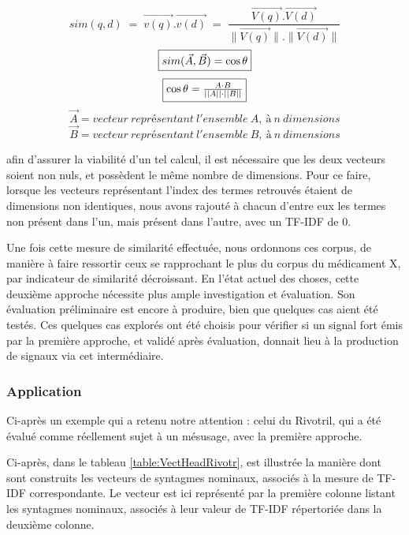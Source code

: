 \documentclass[a4paper, 12pt, openany, oneside, abstract=on]{article} %
\begin{document}
\begin{minipage}{\textwidth}
$$ sim(q,d) \; = \; \vec{v(q)} . \vec{v(d)} \; = \; \frac{\vec{V(q)} . \vec{V(d)}}{\| \vec{V(q)} \| . \| \vec{V(d)} \|} $$
\[\fbox{$sim(\Vec{A},\Vec{B})=\cos{\theta}$}\]
 \[\fbox{$\cos{\theta}=\frac{A \cdot B}{||A|| \cdot ||B||}$}\]
    \footnotesize \[\Vec{A} = vecteur\ représentant\ l'ensemble\ A,\ à\ n\ dimensions\]
    \[\Vec{B} = vecteur\ représentant\ l'ensemble\ B,\ à\ n\ dimensions\]
    \normalsize
\end{minipage}
\vspace{0.5cm}

afin d'assurer la viabilité d'un tel calcul, il est nécessaire que les deux vecteurs soient non nuls, et possèdent le même nombre de dimensions. Pour ce faire, lorsque les vecteurs représentant l'index des termes retrouvés étaient de dimensions non identiques, nous avons rajouté à chacun d'entre eux les termes non présent dans l'un, mais présent dans l'autre, avec un TF-IDF de 0. 

Une fois cette mesure de similarité effectuée, nous ordonnons ces corpus, de manière à faire ressortir ceux se rapprochant le plus du corpus du médicament X, par indicateur de similarité décroissant.
En l'état actuel des choses, cette deuxième approche nécessite plus ample investigation et évaluation. Son évaluation préliminaire est encore à produire, bien que quelques cas aient été testés. Ces quelques cas explorés ont été choisis pour vérifier si un signal fort émis par la première approche, et validé après évaluation, donnait lieu à la production de signaux via cet intermédiaire.

\subsubsection{Application}

Ci-après un exemple qui a retenu notre attention : celui du Rivotril, qui a été évalué comme réellement sujet à un mésusage, avec la première approche.

Ci-après, dans le tableau \ref{table:VectHeadRivotr}, est illustrée la manière dont sont construits les vecteurs de syntagmes nominaux, associés à la mesure de TF-IDF correspondante.
Le vecteur est ici représenté par la première colonne listant les syntagmes nominaux, associés à leur valeur de TF-IDF répertoriée dans la deuxième colonne.
\end{document}
